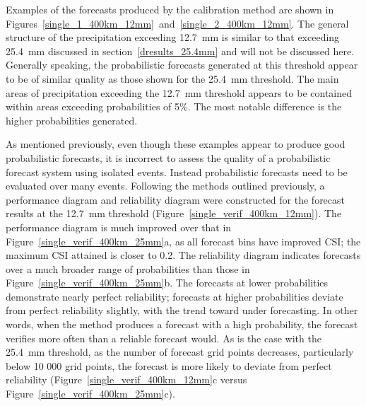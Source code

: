 Examples of the forecasts produced by the calibration method are shown in \mbox{Figures \ref{single_1_400km_12mm} and \ref{single_2_400km_12mm}}. The general structure of the precipitation exceeding \mbox{12.7 mm} is similar to that exceeding \mbox{25.4 mm} discussed in \mbox{section \ref{dresults_25.4mm}} and will not be discussed here.
Generally speaking, the probabilistic forecasts generated at this threshold appear to be of similar quality as those shown for the \mbox{25.4 mm} threshold.
The main areas of precipitation exceeding the \mbox{12.7 mm} threshold appears to be contained within areas exceeding probabilities of \mbox{5\%}.
The most notable difference is the higher probabilities generated.


As mentioned previously, even though these examples appear to produce good probabilistic forecasts, it is incorrect to assess the quality of a probabilistic forecast system using isolated events.
Instead probabilistic forecasts need to be evaluated over many events.
Following the methods outlined previously, a performance diagram and reliability diagram were constructed for the forecast results at the \mbox{12.7 mm} threshold \mbox{(Figure \ref{single_verif_400km_12mm})}.
The performance diagram is much improved over that in \mbox{Figure \ref{single_verif_400km_25mm}a}, as all forecast bins have improved CSI; the maximum CSI attained is closer to 0.2.
The reliability diagram indicates forecasts over a much broader range of probabilities than those in \mbox{Figure \ref{single_verif_400km_25mm}b}.
The forecasts at lower probabilities demonstrate nearly perfect reliability; forecasts at higher probabilities deviate from perfect reliability slightly, with the trend toward under forecasting.
In other words, when the method produces a forecast with a high probability, the forecast verifies more often than a reliable forecast would.
As is the case with the \mbox{25.4 mm} threshold, as the number of forecast grid points decreases, particularly below 10 000 grid points, the forecast is more likely to deviate from perfect reliability (\mbox{Figure \ref{single_verif_400km_12mm}c} versus \mbox{Figure \ref{single_verif_400km_25mm}c}).




